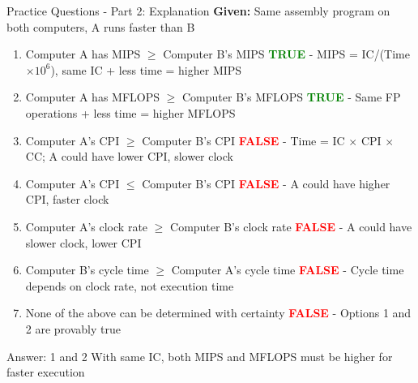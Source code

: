 \documentclass[aspectratio=169,12pt]{beamer}
\begin{document}
\begin{frame}{Practice Questions - Part 2: Explanation}
\small
\textbf{Given:} Same assembly program on both computers, A runs faster than B

\begin{enumerate}
    \item Computer A has MIPS $\geq$ Computer B's MIPS
    \pause \textcolor{green}{\textbf{TRUE}} - MIPS = IC/(Time$\times 10^6$), same IC + less time = higher MIPS
    \pause
    
    \item Computer A has MFLOPS $\geq$ Computer B's MFLOPS
    \pause \textcolor{green}{\textbf{TRUE}} - Same FP operations + less time = higher MFLOPS
    \pause
    
    \item Computer A's CPI $\geq$ Computer B's CPI
    \pause \textcolor{red}{\textbf{FALSE}} - Time = IC $\times$ CPI $\times$ CC; A could have lower CPI, slower clock
    \pause
    
    \item Computer A's CPI $\leq$ Computer B's CPI  
    \pause \textcolor{red}{\textbf{FALSE}} - A could have higher CPI, faster clock
    \pause
    
    \item Computer A's clock rate $\geq$ Computer B's clock rate
    \pause \textcolor{red}{\textbf{FALSE}} - A could have slower clock, lower CPI
    \pause
    
    \item Computer B's cycle time $\geq$ Computer A's cycle time
    \pause \textcolor{red}{\textbf{FALSE}} - Cycle time depends on clock rate, not execution time
    \pause
    
    \item None of the above can be determined with certainty
    \pause \textcolor{red}{\textbf{FALSE}} - Options 1 and 2 are provably true
\end{enumerate}

\pause
\begin{alertblock}{Answer: 1 and 2}
With same IC, both MIPS and MFLOPS must be higher for faster execution
\end{alertblock}
\end{frame}
\end{document}
